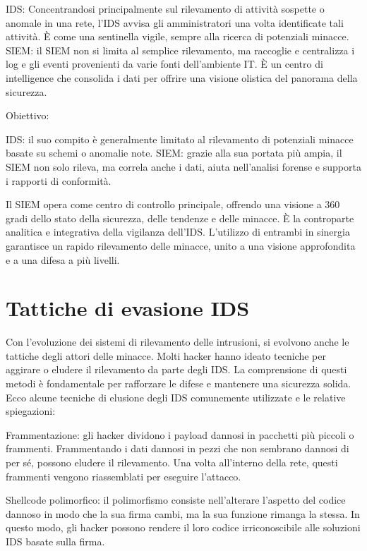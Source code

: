 IDS: Concentrandosi principalmente sul rilevamento di attività sospette o anomale in una rete, l’IDS avvisa gli amministratori una volta identificate tali attività. È come una sentinella vigile, sempre alla ricerca di potenziali minacce.
SIEM: il SIEM non si limita al semplice rilevamento, ma raccoglie e centralizza i log e gli eventi provenienti da varie fonti dell’ambiente IT. È un centro di intelligence che consolida i dati per offrire una visione olistica del panorama della sicurezza.
 

Obiettivo:

IDS: il suo compito è generalmente limitato al rilevamento di potenziali minacce basate su schemi o anomalie note.
SIEM: grazie alla sua portata più ampia, il SIEM non solo rileva, ma correla anche i dati, aiuta nell’analisi forense e supporta i rapporti di conformità.
 

Il SIEM opera come centro di controllo principale, offrendo una visione a 360 gradi dello stato della sicurezza, delle tendenze e delle minacce. È la controparte analitica e integrativa della vigilanza dell’IDS. L’utilizzo di entrambi in sinergia garantisce un rapido rilevamento delle minacce, unito a una visione approfondita e a una difesa a più livelli.


\section{Tattiche di evasione IDS}
Con l’evoluzione dei sistemi di rilevamento delle intrusioni, si evolvono anche le tattiche degli attori delle minacce. Molti hacker hanno ideato tecniche per aggirare o eludere il rilevamento da parte degli IDS. La comprensione di questi metodi è fondamentale per rafforzare le difese e mantenere una sicurezza solida. Ecco alcune tecniche di elusione degli IDS comunemente utilizzate e le relative spiegazioni:

Frammentazione: gli hacker dividono i payload dannosi in pacchetti più piccoli o frammenti. Frammentando i dati dannosi in pezzi che non sembrano dannosi di per sé, possono eludere il rilevamento. Una volta all’interno della rete, questi frammenti vengono riassemblati per eseguire l’attacco.

Shellcode polimorfico: il polimorfismo consiste nell’alterare l’aspetto del codice dannoso in modo che la sua firma cambi, ma la sua funzione rimanga la stessa. In questo modo, gli hacker possono rendere il loro codice irriconoscibile alle soluzioni IDS basate sulla firma.

